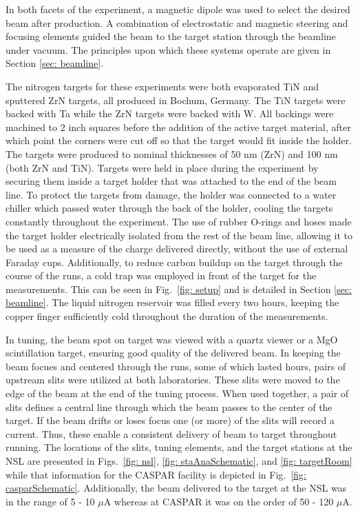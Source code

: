 In both facets of the experiment, a magnetic dipole was used to select the desired beam after production. A combination of electrostatic and magnetic steering and focusing elements guided the beam to the target station through the beamline under vacuum. The principles upon which these systems operate are given in Section \ref{sec: beamline}.

The nitrogen targets for these experiments were both evaporated TiN and sputtered ZrN targets, all produced in Bochum, Germany. The TiN targets were backed with Ta while the ZrN targets were backed with W. All backings were machined to 2 inch squares before the addition of the active target material, after which point the corners were cut off so that the target would fit inside the holder. The targets were produced to nominal thicknesses of 50 nm (ZrN) and 100 nm (both ZrN and TiN). Targets were held in place during the experiment by securing them inside a target holder that was attached to the end of the beam line. To protect the targets from damage, the holder was connected to a water chiller which passed water through the back of the holder, cooling the targets constantly throughout the experiment. The use of rubber O-rings and hoses made the target holder electrically isolated from the rest of the beam line, allowing it to be used as a measure of the charge delivered directly, without the use of external Faraday cups. Additionally, to reduce carbon buildup on the target through the course of the runs, a cold trap was employed in front of the target for the measurements. This can be seen in Fig.\ \ref{fig: setup} and is detailed in Section \ref{sec: beamline}. The liquid nitrogen reservoir was filled every two hours, keeping the copper finger sufficiently cold throughout the duration of the measurements. 

In tuning, the beam spot on target was viewed with a quartz viewer or a MgO scintillation target, ensuring good quality of the delivered beam. In keeping the beam focues and centered through the runs, some of which lasted hours, pairs of upstream slits were utilized at both laboratories. These slits were moved to the edge of the beam at the end of the tuning process. When used together, a pair of slits defines a central line through which the beam passes to the center of the target. If the beam drifts or loses focus one (or more) of the slits will record a current. Thus, these enable a consistent delivery of beam to target throughout running. The locations of the slits, tuning elements, and the target stations at the NSL are presented in Figs.\ \ref{fig: nsl}, \ref{fig: staAnaSchematic}, and \ref{fig: targetRoom} while that information for the CASPAR facility is depicted in Fig.\ \ref{fig: casparSchematic}. Additionally, the beam delivered to the target at the NSL was in the range of 5 - 10 $\mu$A whereas at CASPAR it was on the order of 50 - 120 $\mu$A.

